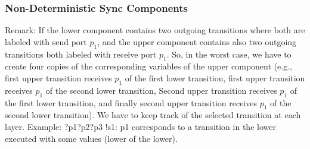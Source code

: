 \documentclass[compress,xcolor=dvipsnames,10pt]{beamer}
\begin{document}
\begin{frame}
 \frametitle{Non-Deterministic Sync Components}
 {\scriptsize
 Remark: If the lower component contains two outgoing transitions where both are labeled with send port $p_1$, and the upper component contains also two outgoing transitions both labeled with receive port $p_1$.
 So, in the worst case, we have to create four copies of the corresponding variables of the upper component (e.g., first upper transition receives $p_1$ of the first lower transition, first upper transition receives $p_1$ of the second lower transition, 
 Second upper transition receives $p_1$ of the first lower transition, and finally second upper transition receives $p_1$ of the second lower transition). We have to keep track of the selected transition at each layer. 
 Example:
 \scriptsize ?p1?p2?p3   !s1: p1 corresponds to a transition in the lower executed with some values (lower of the lower).
 }
\end{frame}
\end{document}
